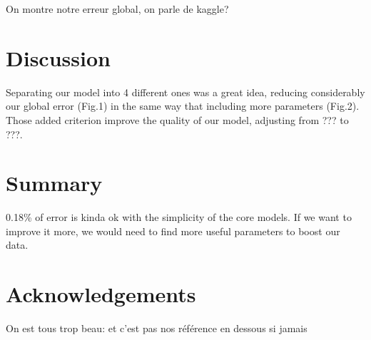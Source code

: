 \documentclass[10pt,conference,compsocconf]{IEEEtran}
\begin{document}
On montre notre erreur global, on parle de kaggle?



\section{Discussion}

Separating our model into 4 different ones was a great idea, reducing considerably our global error (Fig.1) in the same way that including more parameters (Fig.2). Those added criterion improve the quality of our model, adjusting from ??? to ???.    



\section{Summary}
	0.18\% of error is kinda ok with the simplicity of the core models. If we want to improve it more, we would need to find more useful parameters to boost our data.

\section*{Acknowledgements}
On est tous trop beau: et c'est pas nos r\'ef\'erence en dessous si jamais



\end{document}
